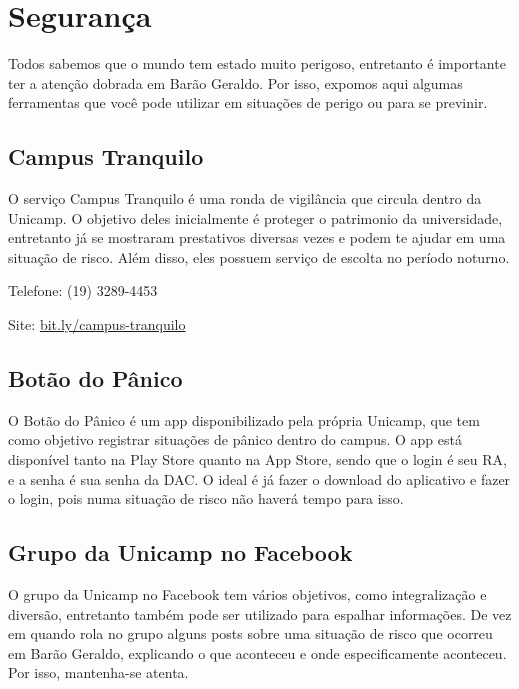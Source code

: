 
\section{Segurança}

Todos sabemos que o mundo tem estado muito perigoso, entretanto é importante ter a atenção dobrada em Barão Geraldo. Por isso, expomos aqui algumas ferramentas que você pode utilizar em situações de perigo ou para se previnir.

\subsection{Campus Tranquilo}

O serviço Campus Tranquilo é uma ronda de vigilância que circula dentro da Unicamp. O objetivo deles inicialmente é proteger o patrimonio da universidade, entretanto já se mostraram prestativos diversas vezes e podem te ajudar em uma situação de risco. Além disso, eles possuem serviço de escolta no período noturno.

Telefone: (19) 3289-4453

Site: \url{bit.ly/campus-tranquilo}


\subsection{Botão do Pânico}

O Botão do Pânico é um app disponibilizado pela própria Unicamp, que tem como objetivo registrar situações de pânico dentro do campus. O app está disponível tanto na Play Store quanto na App Store, sendo que o login é seu RA, e a senha é sua senha da DAC. O ideal é já fazer o download do aplicativo e fazer o login, pois numa situação de risco não haverá tempo para isso.

\subsection{Grupo da Unicamp no Facebook}

O grupo da Unicamp no Facebook tem vários objetivos, como integralização e diversão, entretanto também pode ser utilizado para espalhar informações. De vez em quando rola no grupo alguns posts sobre uma situação de risco que ocorreu em Barão Geraldo, explicando o que aconteceu e onde especificamente aconteceu. Por isso, mantenha-se atenta.
